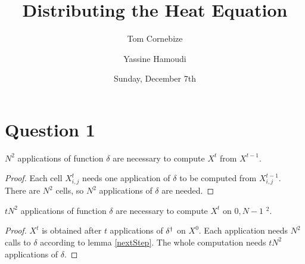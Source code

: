 


\title{Distributing the Heat Equation}
\author{Tom Cornebize \and Yassine Hamoudi}
\date{Sunday, December 7th}



\maketitle


\section{Question 1}

\begin{lemma}
  \label{nextStep}
  $N^2$ applications of function $\delta$ are necessary to compute $X^t$ from $X^{t-1}$.
\end{lemma}

\begin{proof}
 Each cell $X^{t}_{i,j}$ needs one application of $\delta$ to be computed from $X^{t-1}_{i,j}$. There are $N^2$ cells, so $N^2$ applications of $\delta$ are needed.
\end{proof}

\begin{prop}
  $tN^2$ applications of function $\delta$ are necessary to compute $X^t$ on \textlbrackdbl $0,N-1$ \textrbrackdbl$^2$.
\end{prop}

\begin{proof}
 $X^t$ is obtained after $t$ applications of $\delta^\dag$ on $X^0$. Each application needs $N^2$ calls to $\delta$ according to lemma \ref{nextStep}. The whole computation needs $tN^2$ applications of $\delta$.
\end{proof}

